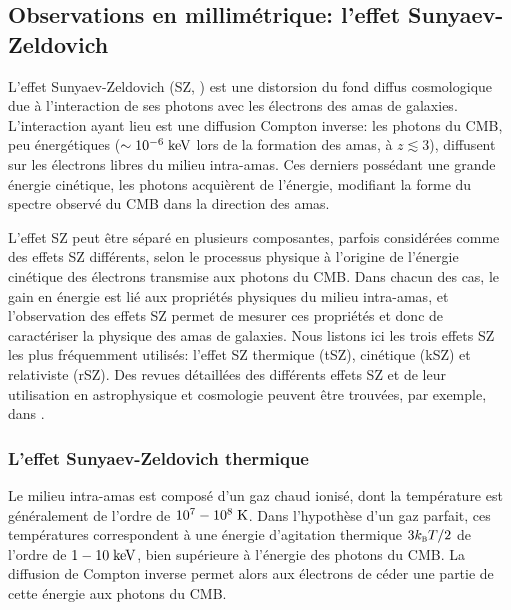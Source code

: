 \subsection{Observations en millimétrique: l'effet Sunyaev-Zeldovich}\label{sec:sz}

L'effet Sunyaev-Zeldovich (SZ, \cite{zeldovich_interaction_1969, sunyaev_interaction_1970,sunyaev_observations_1972,sunyaev_velocity_1980}) est une distorsion du fond diffus cosmologique due à l'interaction de ses photons avec les électrons des amas de galaxies.
L'interaction ayant lieu est une diffusion Compton inverse: les photons du CMB, peu énergétiques ($\sim 10^{-6} \;{\rm keV}$ lors de la formation des amas, à $z \lesssim 3$), diffusent sur les électrons libres du milieu intra-amas.
Ces derniers possédant une grande énergie cinétique, les photons acquièrent de l'énergie, modifiant la forme du spectre observé du CMB dans la direction des amas.

L'effet SZ peut être séparé en plusieurs composantes, parfois considérées comme des effets SZ différents, selon le processus physique à l'origine de l'énergie cinétique des électrons transmise aux photons du CMB.
Dans chacun des cas, le gain en énergie est lié aux propriétés physiques du milieu intra-amas, et l'observation des effets SZ permet de mesurer ces propriétés et donc de caractériser la physique des amas de galaxies.
Nous listons ici les trois effets SZ les plus fréquemment utilisés: l'effet SZ thermique (tSZ), cinétique (kSZ) et relativiste (rSZ).
Des revues détaillées des différents effets SZ et de leur utilisation en astrophysique et cosmologie peuvent être trouvées, par exemple, dans \cite{birkinshaw_sunyaevzeldovich_1999,carlstrom_cosmology_2002,mroczkowski_astrophysics_2019}.

\subsubsection{L'effet Sunyaev-Zeldovich thermique} %
Le milieu intra-amas est composé d'un gaz chaud ionisé, dont la température est généralement de l'ordre de $10^7 - 10^8 \;{\rm K}$.
Dans l'hypothèse d'un gaz parfait, ces températures correspondent à une énergie d'agitation thermique $3 k_\textsc{b} T / 2$ de l'ordre de $1-10 \;{\rm keV}$, bien supérieure à l'énergie des photons du CMB.
La diffusion de Compton inverse permet alors aux électrons de céder une partie de cette énergie aux photons du CMB.

